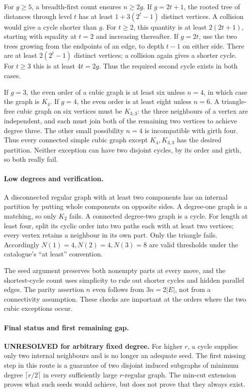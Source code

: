 \documentclass[11pt,a4paper]{article}
\begin{document}
For $g\ge5$, a breadth-first count ensures $n\ge2g$. If
$g=2t+1$, the rooted tree of distances through level $t$ has at least
$1+3(2^t-1)$ distinct vertices. A collision would give a cycle shorter
than $g$. For $t\ge2$, this quantity is at least $2(2t+1)$, starting
with equality at $t=2$ and increasing thereafter. If $g=2t$, use the
two trees growing from the endpoints of an edge, to depth $t-1$
on either side. There are at least $2(2^t-1)$ distinct vertices;
a collision again gives a shorter cycle. For $t\ge3$ this is at
least $4t=2g$. Thus the required second cycle exists in both cases.

If $g=3$, the even order of a cubic graph is at least six unless
$n=4$, in which case the graph is $K_4$. If $g=4$, the even order
is at least eight unless $n=6$. A triangle-free cubic graph on six
vertices must be $K_{3,3}$: the three neighbours of a vertex are
independent, and each must join both of the remaining two vertices
to achieve degree three. The other small possibility $n=4$ is
incompatible with girth four. Thus every connected simple cubic
graph except $K_4,K_{3,3}$ has the desired partition. Neither exception
can have two disjoint cycles, by its order and girth, so both really fail.

\paragraph{Low degrees and verification.}
A disconnected regular graph with at least two components has an
internal partition by putting whole components on opposite sides.
A degree-one graph is a matching, so only $K_2$ fails. A connected
degree-two graph is a cycle. For length at least four, split its
cyclic order into two paths each with at least two vertices; every
vertex retains a neighbour in its own part. Only the triangle fails.
Accordingly $N(1)=4,N(2)=4,N(3)=8$ are valid thresholds
under the catalogue's ``at least'' convention.

The seed argument preserves both nonempty parts at every move, and
the shortest-cycle count uses simplicity to rule out shorter cycles
and hidden parallel edges. The parity assertion $n$ even follows
from $3n=2|E|$, not from a connectivity assumption. These checks
are important at the orders where the two cubic exceptions occur.

\paragraph{Final status and first remaining gap.}
\textbf{UNRESOLVED for arbitrary fixed degree.} For higher $r$, a
cycle supplies only two internal neighbours and is no longer an
adequate seed. The first missing step in this route is a guarantee
of two disjoint induced subgraphs of minimum degree
$\lceil r/2\rceil$ in every sufficiently large $r$-regular graph.
The min-cut extension proves what such seeds would achieve, but does
not prove that they always exist.
\end{document}
